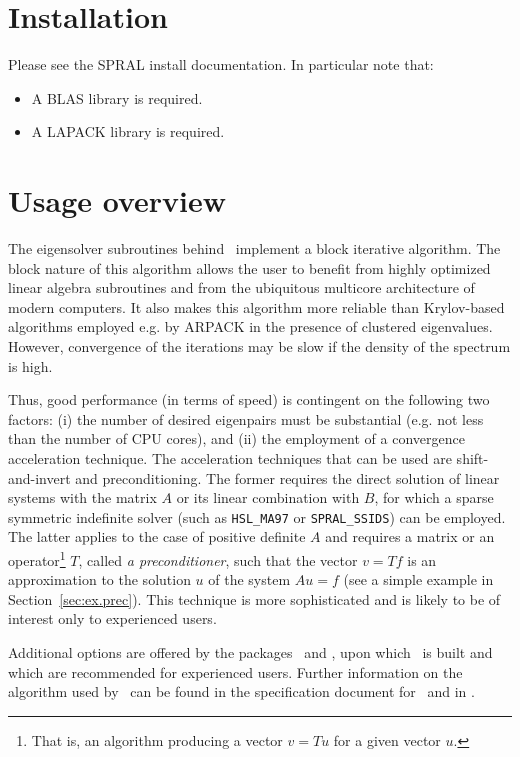 
\section{Installation}
Please see the SPRAL install documentation. In particular note that:
\begin{itemize}
   \item A BLAS library is required.
   \item A LAPACK library is required.
\end{itemize}

\section{Usage overview}

\label{sec:summary}

The eigensolver subroutines
behind \fullpackagename\
implement a block iterative algorithm.
The block nature of this algorithm allows the user
to benefit from highly optimized linear algebra subroutines
and from the ubiquitous multicore architecture
of modern computers.
It also makes this algorithm more reliable
than Krylov-based algorithms employed e.g. by ARPACK
in the presence of clustered eigenvalues.
However, convergence of the iterations may be slow
if the density of the spectrum is high.

Thus, good performance 
(in terms of speed)
is contingent on the following two factors:
(i) the number of desired
eigenpairs must be substantial
(e.g. not less than the number of CPU cores),
and
(ii) the employment of a convergence acceleration technique.
The acceleration techniques that can be used 
are shift-and-invert and preconditioning.
The former requires
the direct solution of linear systems
with the matrix $A$ or its linear combination with $B$,
for which a sparse symmetric indefinite solver
(such as {\tt HSL\_MA97} or {\tt SPRAL\_SSIDS}) can be employed.
The latter applies to the case of positive definite $A$ and
requires a matrix or an operator\footnote{
That is, an algorithm producing a vector $v = T u$ for a given
vector $u$.
}
$T$, called {\em a preconditioner},
such that the vector
$v = T f$ is an approximation to the solution $u$
of the system $A u = f$
(see a simple example in Section~\ref{sec:ex.prec}).
This technique is more sophisticated
and is likely to be of interest only to experienced users.

Additional
options are offered by
the packages \advanced\ and \engine,
upon which \fullpackagename\ is built
and which are recommended for experienced users.
Further information on the algorithm used by
\fullpackagename\ can be found in the
specification document for \engine\
and in \report.

